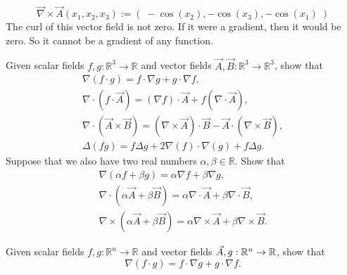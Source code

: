 \documentclass[11pt]{article}
\begin{document}
\begin{solution}


    \[
        \vec{\nabla} \times \vec{A}(x_1,x_2,x_3)
        :=
        \left(\;
            -\cos(x_2),  -\cos(x_3), -\cos(x_1)
        \;\right)
    \]
    The curl of this vector field is not zero. 
    If it were a gradient, then it would be zero. 
    So it cannot be a gradient of any function.
     
\end{solution}



\begin{exercise}
	Given scalar fields $f, g : \mathbb{R}^3 \to \mathbb{R}$ and vector fields $\vec{A}, \vec{B} : \mathbb{R}^3 \to \mathbb{R}^3$,
    show that 
    \begin{gather*}
        \nabla\left( f \cdot g \right)
        = 
        f \cdot \nabla g
        +
        g \cdot \nabla f
        ,
        \\
        \nabla\cdot\left( f \cdot \vec{A} \right)
        = 
        ( \nabla f ) \cdot \vec{A}
        +
        f ( \nabla \cdot \vec{A} )
        ,
        \\ 
        \nabla\cdot\left( \vec{A} \times \vec{B} \right)
        = 
        \left( \nabla\times\vec{A} \right) \cdot \vec{B}
        -
        \vec{A} \cdot \left( \nabla\times\vec{B} \right)
        ,
        \\ 
        \Delta ( f g )
        = 
        f \Delta g + 2 \nabla(f) \cdot \nabla( g ) + f \Delta g
        .
    \end{gather*}
    Suppose that we also have two real numbers $\alpha, \beta \in \mathbb R$.
    Show that 
    \begin{gather*}
        \nabla( \alpha f + \beta g )
        = 
        \alpha \nabla f + \beta \nabla g
        ,
        \\ 
        \nabla\cdot ( \alpha \vec{A} + \beta \vec{B} )
        = 
        \alpha \nabla\cdot \vec{A} + \beta \nabla\cdot \vec{B}
        ,
        \\ 
        \nabla\times ( \alpha \vec{A} + \beta \vec{B} )
        = 
        \alpha \nabla\times \vec{A} + \beta \nabla\times \vec{B}
        .
    \end{gather*}
\end{exercise}

\begin{solution}
    Given scalar fields $f, g : \mathbb{R}^n \to \mathbb{R}$ and vector fields $\vec{A}, g : \mathbb{R}^n \to \mathbb{R}$,
    show that 
    \[
        \nabla\left( f \cdot g \right)
        = 
        f \cdot \nabla g
        +
        g \cdot \nabla f
        .
    \]
\end{solution}
\end{document}
